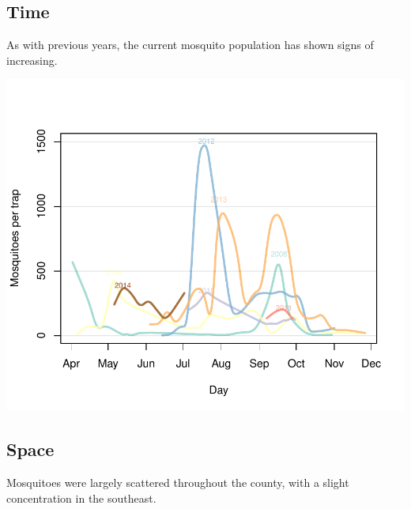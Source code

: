 \documentclass{article}
\begin{document}
\begin{multicols}{2} 



\subsection*{Time}
As with previous years, the current mosquito population has shown signs of increasing.  
\begin{center}
\includegraphics{mosquitoReport-002}
\end{center}


\vfill
\columnbreak
\subsection*{Space}
Mosquitoes were largely scattered throughout the county, with a slight concentration in the southeast.


\end{multicols}
\end{document}
